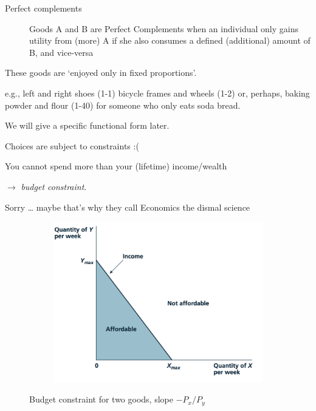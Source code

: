 \documentclass[table]{beamer}
\begin{document}
\begin{frame}

\begin{description}
\item[Perfect complements]
Goods A and B are Perfect Complements when an individual only gains
utility from (more) A if she also consumes a defined (additional) amount
of B, and vice-versa
\end{description}

\bigskip

These goods are `enjoyed only in fixed proportions'.

e.g., left and right shoes (1-1) bicycle frames and wheels (1-2) or,
perhaps, baking powder and flour (1-40) for someone who only eats soda
bread.

We will give a specific functional form later.

\begin{block}{Choices are subject to constraints :(}

You cannot spend more than your (lifetime) income/wealth

\(\rightarrow\) \emph{budget constraint}.

Sorry \ldots{} maybe that's why they call Economics the dismal science

\begin{figure}[hb]
  \centering
    \begin{figure}
    
    {\centering \includegraphics[width=0.75\linewidth]{picsfigs/budgetconstraint} 
    
    }
    
    \end{figure}
  \caption[Budget constraint for two goods]
   {Budget constraint for two goods, slope $-P_x/P_y$}
\end{figure}


\end{block}
\end{frame}
\end{document}
